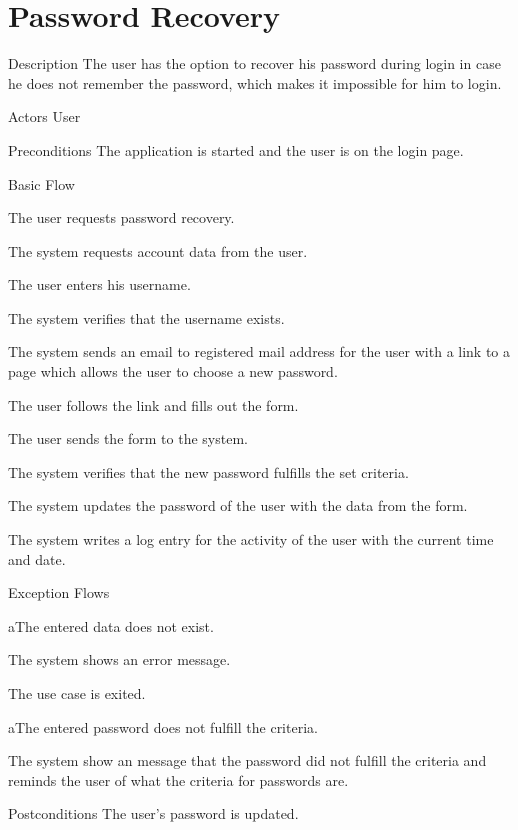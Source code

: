 \section{Password Recovery}

%
\begin{cpart}{Description}
The user has the option to recover his password during login in case he does not remember the password, which makes it impossible for him to login.
\end{cpart}


%
\begin{cpart}{Actors}
User
\end{cpart}

%
\begin{cpart}{Preconditions}
The application is started and the user is on the login page.
\end{cpart}

%
\begin{cpartList}{Basic Flow}
  \item The user requests password recovery.
  \item The system requests account data from the user.
  \item The user enters his username.
  \item The system verifies that the username exists.
  \item The system sends an email to registered mail address for the user with a link to a page which allows the user to choose a new password.
  \item The user follows the link and fills out the form.
  \item The user sends the form to the system.
  \item The system verifies that the new password fulfills the set criteria.
  \item The system updates the password of the user with the data from the form.
  \item The system writes a log entry for the activity of the user with the current time and date.
\end{cpartList}

%
\begin{cpartList}{Exception Flows}
  \begin{innerList}{4}{a}{The entered data does not exist.}
    \item The system shows an error message.
    \item The use case is exited.
  \end{innerList}
  \begin{innerList}{9}{a}{The entered password does not fulfill the criteria.}
    \item The system show an message that the password did not fulfill the criteria and reminds the user of what the criteria for passwords are.
  \end{innerList}
\end{cpartList}

%
\begin{cpart}{Postconditions}
The user's password is updated.
\end{cpart}


